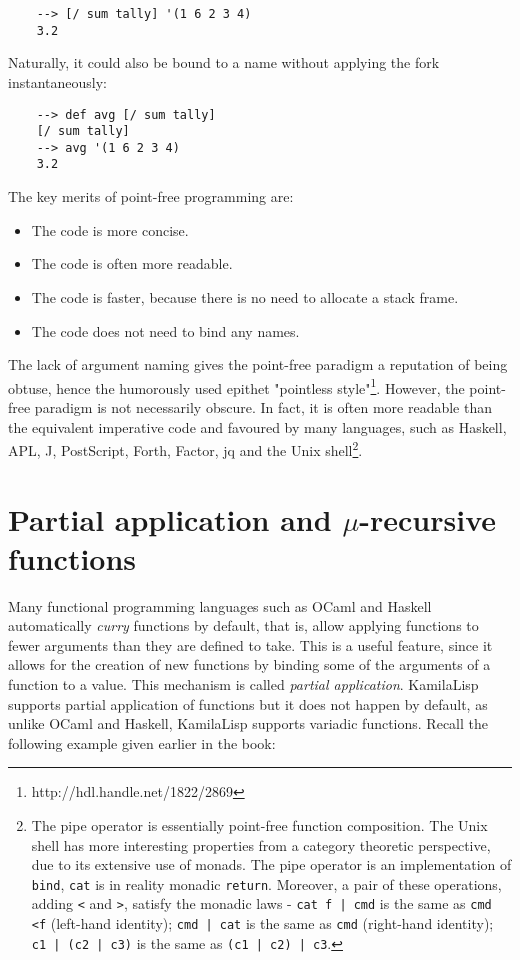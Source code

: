 \begin{Verbatim}
    --> [/ sum tally] '(1 6 2 3 4)
    3.2
\end{Verbatim}

Naturally, it could also be bound to a name without applying the fork instantaneously:

\begin{Verbatim}
    --> def avg [/ sum tally]
    [/ sum tally]
    --> avg '(1 6 2 3 4)
    3.2
\end{Verbatim}

The key merits of point-free programming are:

\begin{itemize}
    \item The code is more concise.
    \item The code is often more readable.
    \item The code is faster, because there is no need to allocate a stack frame.
    \item The code does not need to bind any names.
\end{itemize}

The lack of argument naming gives the point-free paradigm a reputation of being obtuse, hence the humorously used epithet "pointless style"\footnote{http://hdl.handle.net/1822/2869}. However, the point-free paradigm is not necessarily obscure. In fact, it is often more readable than the equivalent imperative code and favoured by many languages, such as Haskell, APL, J, PostScript, Forth, Factor, jq and the Unix shell\footnote{The pipe operator is essentially point-free function composition. The Unix shell has more interesting properties from a category theoretic perspective, due to its extensive use of monads. The pipe operator is an implementation of \verb|bind|, \verb|cat| is in reality monadic \verb|return|. Moreover, a pair of these operations, adding \verb|<| and \verb|>|, satisfy the monadic laws - \verb$cat f | cmd$ is the same as \verb|cmd <f| (left-hand identity); \verb$cmd | cat$ is the same as \verb|cmd| (right-hand identity); \verb$c1 | (c2 | c3)$ is the same as \verb$(c1 | c2) | c3$.}.

\section{Partial application and \texorpdfstring{$\mu$}{mu}-recursive functions}

Many functional programming languages such as OCaml and Haskell automatically \textit{curry} functions by default, that is, allow applying functions to fewer arguments than they are defined to take. This is a useful feature, since it allows for the creation of new functions by binding some of the arguments of a function to a value. This mechanism is called \textit{partial application}. KamilaLisp supports partial application of functions but it does not happen by default, as unlike OCaml and Haskell, KamilaLisp supports variadic functions. Recall the following example given earlier in the book:

